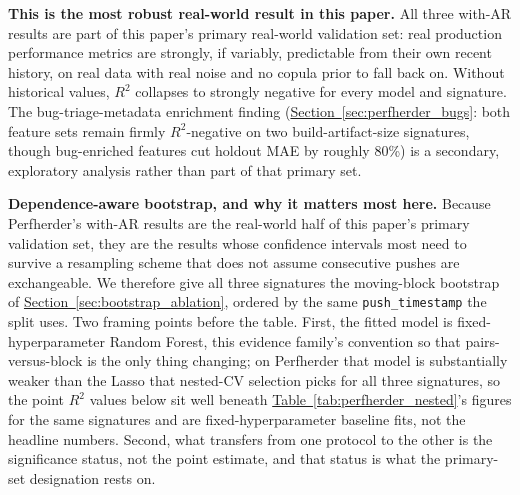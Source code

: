 \documentclass[technologies,article,submit,pdftex,moreauthors]{Definitions/mdpi}
\begin{document}
\textbf{This is the most robust real-world result in this paper.} All three with-AR results are part of this paper's primary real-world validation set: real production performance metrics are strongly, if variably, predictable from their own recent history, on real data with real noise and no copula prior to fall back on. Without historical values, \(R^2\) collapses to strongly negative for every model and signature. The bug-triage-metadata enrichment finding (\hyperref[sec:perfherder_bugs]{Section~\ref*{sec:perfherder_bugs}}: both feature sets remain firmly \(R^2\)-negative on two build-artifact-size signatures, though bug-enriched features cut holdout MAE by roughly 80\%) is a secondary, exploratory analysis rather than part of that primary set.

\textbf{Dependence-aware bootstrap, and why it matters most here.} Because Perfherder's with-AR results are the real-world half of this paper's primary validation set, they are the results whose confidence intervals most need to survive a resampling scheme that does not assume consecutive pushes are exchangeable. We therefore give all three signatures the moving-block bootstrap of \hyperref[sec:bootstrap_ablation]{Section~\ref*{sec:bootstrap_ablation}}, ordered by the same \texttt{push\_timestamp} the split uses. Two framing points before the table. First, the fitted model is fixed-hyperparameter Random Forest, this evidence family's convention so that pairs-versus-block is the only thing changing; on Perfherder that model is substantially weaker than the Lasso that nested-CV selection picks for all three signatures, so the point \(R^2\) values below sit well beneath \hyperref[tab:perfherder_nested]{Table~\ref*{tab:perfherder_nested}}'s figures for the same signatures and are fixed-hyperparameter baseline fits, not the headline numbers. Second, what transfers from one protocol to the other is the significance status, not the point estimate, and that status is what the primary-set designation rests on.
\end{document}
